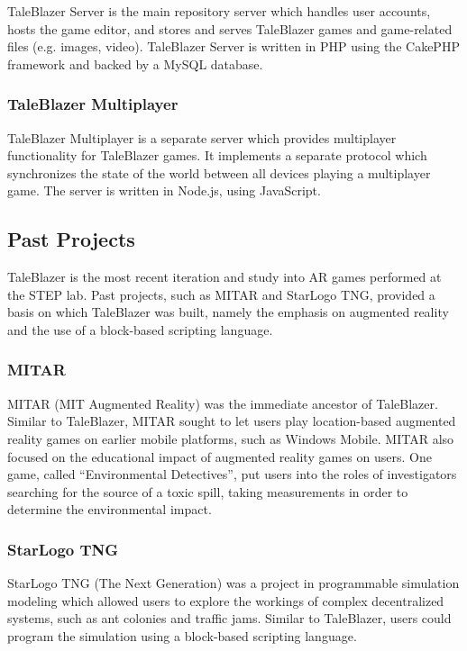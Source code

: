 TaleBlazer Server is the main repository server which handles user accounts, hosts the game editor, and stores and serves TaleBlazer games and game-related files (e.g. images, video). TaleBlazer Server is written in PHP using the CakePHP framework and backed by a MySQL database. 

\subsubsection{TaleBlazer Multiplayer}

TaleBlazer Multiplayer is a separate server which provides multiplayer functionality for TaleBlazer games. It implements a separate protocol which synchronizes the state of the world between all devices playing a multiplayer game. The server is written in Node.js, using JavaScript.

\subsection{Past Projects}

TaleBlazer is the most recent iteration and study into AR games performed at the STEP lab. Past projects, such as MITAR and StarLogo TNG, provided a basis on which TaleBlazer was built, namely the emphasis on augmented reality and the use of a block-based scripting language.

\subsubsection{MITAR}

MITAR (MIT Augmented Reality) was the immediate ancestor of TaleBlazer. Similar to TaleBlazer, MITAR sought to let users play location-based augmented reality games on earlier mobile platforms, such as Windows Mobile. MITAR also focused on the educational impact of augmented reality games on users. One game, called ``Environmental Detectives'', put users into the roles of investigators searching for the source of a toxic spill, taking measurements in order to determine the environmental impact. \cite{site:ed}

\subsubsection{StarLogo TNG}

StarLogo TNG (The Next Generation) was a project in programmable simulation modeling which allowed users to explore the workings of complex decentralized systems, such as ant colonies and traffic jams. \cite{site:starlogo} Similar to TaleBlazer, users could program the simulation using a block-based scripting language. 

